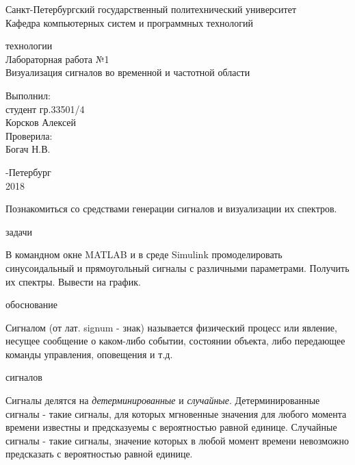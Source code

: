 \documentclass[a4paper,12pt]{article}
\begin{document}
\begin{center}
Санкт-Петербургский государственный политехнический университет
\\Кафедра компьютерных систем и программных технологий
\end{center}
\vspace*{10em plus .6em minus .5em}

\begin{center}
{ технологии
\\Лабораторная работа №1
\\Визуализация сигналов во временной и частотной области}
\end{center}

\vspace*{5em plus .6em minus .5em}
\begin{flushright}
Выполнил:\\студент гр.33501/4\\Корсков Алексей\\Проверила:\\Богач Н.В.
\end{flushright}

\vspace*{15em plus .6em minus .5em}
\begin{center}
{-Петербург
\\2018}
\end{center}
\pagestyle{empty}
\newpage
\pagestyle{plain}
{}

Познакомиться со средствами генерации сигналов и визуализации их спектров.

{ задачи}

В командном окне MATLAB и в среде Simulink промоделировать синусоидальный и прямоугольный сигналы с различными параметрами. Получить их спектры. Вывести на график.

{ обоснование}

Сигналом (от лат. signum - знак) называется физический процесс или явление, несущее сообщение о каком-либо событии, состоянии объекта, либо передающее команды управления, оповещения и т.д.

{ сигналов}

Сигналы делятся на \textit{детерминированные} и \textit{случайные}. Детерминированные сигналы - такие сигналы, для которых мгновенные значения для любого момента времени известны и предсказуемы с вероятностью равной единице. Случайные сигналы - такие сигналы, значение которых в любой момент времени невозможно предсказать с вероятностью равной единице.
\end{document}
